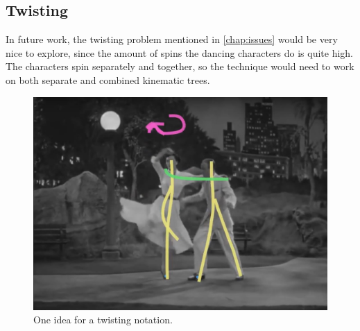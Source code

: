 \subsection{Twisting}
In future work, the twisting problem mentioned in \autoref{chap:issues} would be very nice to explore, since the amount of spins the dancing characters do is quite high. The characters spin separately and together, so the technique would need to work on both separate and combined kinematic trees.
\begin{figure}[!h]
\centering
\includegraphics[scale=0.5]{img/twistingannotation}
\caption{One idea for a twisting notation.}
\end{figure}
